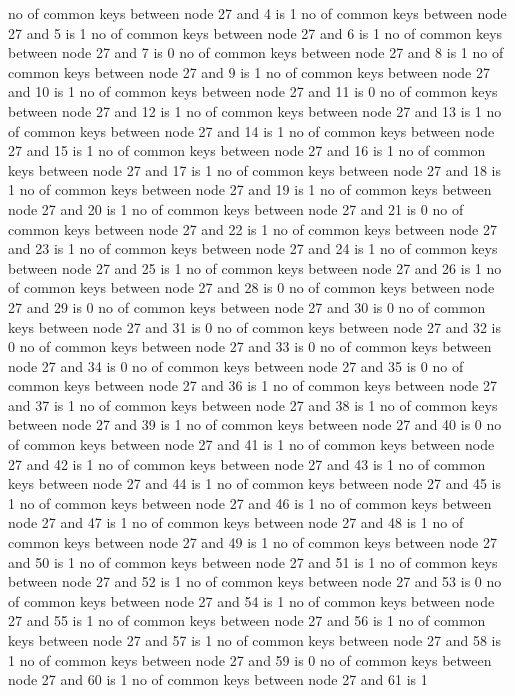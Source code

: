 no of common keys between node 27 and 4 is 1
no of common keys between node 27 and 5 is 1
no of common keys between node 27 and 6 is 1
no of common keys between node 27 and 7 is 0
no of common keys between node 27 and 8 is 1
no of common keys between node 27 and 9 is 1
no of common keys between node 27 and 10 is 1
no of common keys between node 27 and 11 is 0
no of common keys between node 27 and 12 is 1
no of common keys between node 27 and 13 is 1
no of common keys between node 27 and 14 is 1
no of common keys between node 27 and 15 is 1
no of common keys between node 27 and 16 is 1
no of common keys between node 27 and 17 is 1
no of common keys between node 27 and 18 is 1
no of common keys between node 27 and 19 is 1
no of common keys between node 27 and 20 is 1
no of common keys between node 27 and 21 is 0
no of common keys between node 27 and 22 is 1
no of common keys between node 27 and 23 is 1
no of common keys between node 27 and 24 is 1
no of common keys between node 27 and 25 is 1
no of common keys between node 27 and 26 is 1
no of common keys between node 27 and 28 is 0
no of common keys between node 27 and 29 is 0
no of common keys between node 27 and 30 is 0
no of common keys between node 27 and 31 is 0
no of common keys between node 27 and 32 is 0
no of common keys between node 27 and 33 is 0
no of common keys between node 27 and 34 is 0
no of common keys between node 27 and 35 is 0
no of common keys between node 27 and 36 is 1
no of common keys between node 27 and 37 is 1
no of common keys between node 27 and 38 is 1
no of common keys between node 27 and 39 is 1
no of common keys between node 27 and 40 is 0
no of common keys between node 27 and 41 is 1
no of common keys between node 27 and 42 is 1
no of common keys between node 27 and 43 is 1
no of common keys between node 27 and 44 is 1
no of common keys between node 27 and 45 is 1
no of common keys between node 27 and 46 is 1
no of common keys between node 27 and 47 is 1
no of common keys between node 27 and 48 is 1
no of common keys between node 27 and 49 is 1
no of common keys between node 27 and 50 is 1
no of common keys between node 27 and 51 is 1
no of common keys between node 27 and 52 is 1
no of common keys between node 27 and 53 is 0
no of common keys between node 27 and 54 is 1
no of common keys between node 27 and 55 is 1
no of common keys between node 27 and 56 is 1
no of common keys between node 27 and 57 is 1
no of common keys between node 27 and 58 is 1
no of common keys between node 27 and 59 is 0
no of common keys between node 27 and 60 is 1
no of common keys between node 27 and 61 is 1
